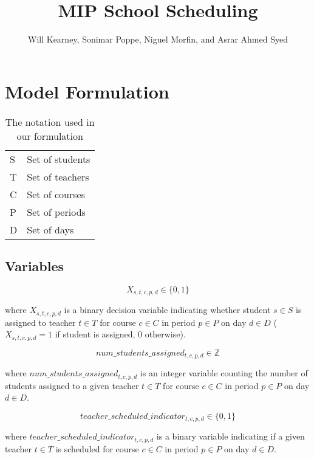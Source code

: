 \documentclass[12pt]{article}
\title{MIP School Scheduling}
\author{Will Kearney, Sonimar Poppe, Niguel Morfin, and Asrar Ahmed Syed}
\begin{document}
\maketitle

\section{Model Formulation}

\begin{table}[]
\centering
\caption{The notation used in our formulation}
\label{notationl}
\begin{tabular}{ll}
\hline
S & Set of students \\
T & Set of teachers \\
C & Set of courses  \\
P & Set of periods  \\
D & Set of days    \\ \hline
\end{tabular}
\end{table}

\subsection{Variables}

\begin{equation}
	X_{s,t,c,p,d} \in \{0,1\}
\end{equation}

where $X_{s,t,c,p,d}$ is a binary decision variable indicating whether student $s \in S$ is assigned to teacher $t \in T$ for course $c \in C$ in period $p \in P$ on day $d \in D$ ($X_{s,t,c,p,d}=1$ if student is assigned, 0 otherwise).


\begin{equation}
	num\_students\_assigned_{t,c,p,d} \in \mathbb{Z}
\end{equation}

where $num\_students\_assigned_{t,c,p,d}$ is an integer variable counting the number of students assigned to a given teacher $t \in T$ for course $c \in C$ in period $p \in P$ on day $d \in D$.


\begin{equation}
	teacher\_scheduled\_indicator_{t,c,p,d} \in \{0,1\}
\end{equation}

where $teacher\_scheduled\_indicator_{t,c,p,d}$ is a binary variable indicating if a given teacher $t \in T$ is scheduled for course $c \in C$ in period $p \in P$ on day $d \in D$.
\end{document}
